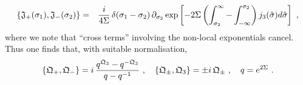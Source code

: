 \documentclass[12pt]{article}
\def\ee{\boldsymbol{e}}
\def\be{\begin{equation}}
\def\ee{\end{equation}}
\begin{document}
\be\begin{aligned}
\{ \frak{J}_+(\sigma_1), \frak{J}_-(\sigma_2) \} 
&=& \frac{i}{4   \Sigma} \, \delta(\sigma_1- \sigma_2) \,    \partial_{\sigma_2}    \exp\left[ - 2 \Sigma \left(\int_{\sigma_2}^\infty  -  \int_{-\infty}^{\sigma_2}\right)  j_3 (\hat{\sigma}) d\hat{\sigma}  \right]  \ ,
 \end{aligned} 
\ee
 where we note that ``cross terms'' involving the non-local exponentials cancel.   Thus one finds that, with suitable normalisation, 
 \be\label{eq:quantumgroup}
 \{ \frak{Q}_+, \frak{Q}_- \}  =   i\, \frac{q^{\frak{Q}_3} - q^{- \frak{Q}_3}  }{q -q^{-1} } \ , \quad  \{ \frak{Q}_\pm, \frak{Q}_3 \}  =  \pm i \,\frak{Q}_\pm \ , \quad  
 q =  e^{2 \Sigma} \ .
 \ee
  
\end{document}
